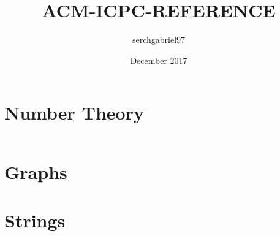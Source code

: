 \documentclass{article}
\title{ACM-ICPC-REFERENCE}
\author{serchgabriel97 }
\date{December 2017}
\begin{document}
\maketitle
\newpage
\tableofcontents
\newpage
\begin{multicols}{2}
\section{Number Theory}
\inputminted{python}{gcd.cpp}
\section{Graphs}
\section{Strings}
\end{multicols}
\end{document}
